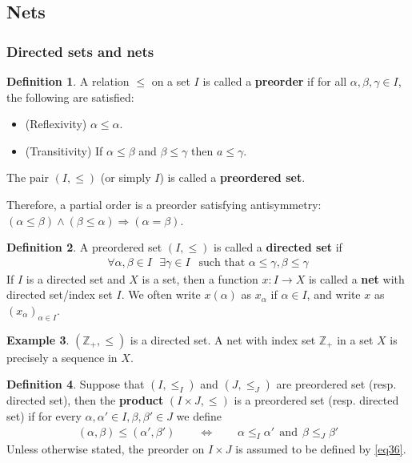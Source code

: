 \documentclass[12pt,b5paper,notitlepage]{article}
\theoremstyle{definition}
\newtheorem{df}{Definition}[section]
\newtheorem{eg}[df]{Example}
\theoremstyle{plain}
\newcommand{\Zbb}{\mathbb Z}
\numberwithin{equation}{section}
\begin{document}
\subsection{Nets}\label{lb147}


\subsubsection{Directed sets and nets}

\begin{df}\label{lb116}
A relation $\leq$ on a set $I$ is called a \textbf{preorder}  if for all $\alpha,\beta,\gamma\in I$, the following are satisfied:
\begin{itemize}
\item (Reflexivity) $\alpha\leq \alpha$.
\item (Transitivity) If $\alpha\leq \beta$ and $\beta\leq \gamma$ then $a\leq \gamma$.
\end{itemize}
The pair $(I,\leq)$ (or simply $I$) is called a \textbf{preordered set}.
\end{df}

Therefore, a partial order is a preorder satisfying antisymmetry: $(\alpha\leq \beta)\land(\beta\leq\alpha)\Rightarrow (\alpha=\beta)$.

\begin{df}
A preordered set $(I,\leq)$ is called a \textbf{directed set}  if 
\begin{align}
\forall\alpha,\beta\in I~~~\exists\gamma\in I~~\text{ such that }\alpha\leq \gamma,\beta\leq\gamma  \label{eq37}
\end{align}
If $I$ is a directed set and $X$ is a set, then a function $x:I\rightarrow X$ is called a \textbf{net}  with directed set/index set $I$. We often write $x(\alpha)$ as $x_\alpha$ if $\alpha\in I$, and write $x$ as $(x_\alpha)_{\alpha\in I}$.
\end{df}


\begin{eg}
$(\Zbb_+,\leq)$ is a directed set. A net with index set $\Zbb_+$ in a set $X$ is precisely a sequence in $X$.
\end{eg}

\begin{df}\label{lb117}
Suppose that $(I,\leq_I )$ and $(J,\leq_J)$ are preordered set (resp. directed set), then the \textbf{product}  $(I\times J,\leq)$ is a preordered set (resp. directed set) if for every $\alpha,\alpha'\in I,\beta,\beta'\in J$ we define
\begin{align}\label{eq36}
(\alpha,\beta)\leq (\alpha',\beta')\qquad\Longleftrightarrow\qquad \alpha\leq_I \alpha'~~\text{and}~~\beta\leq_J\beta'
\end{align}
Unless otherwise stated, the preorder on $I\times J$ is assumed to be defined by \eqref{eq36}.
\end{df}
\end{document}
